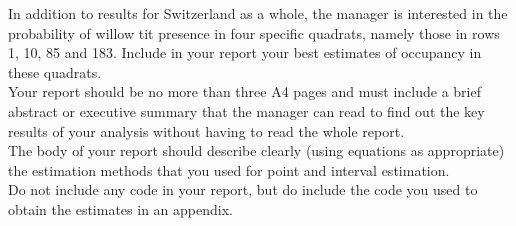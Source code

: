 In addition to results for Switzerland as a whole, the manager is interested in the probability of willow tit presence in four specific quadrats, namely those in rows 1, 10, 85 and 183. Include in your report your best estimates of occupancy in these quadrats. \\

Your report should be no more than three A4 pages and must include a brief abstract or executive summary that the manager can read to find out the key results of your analysis without having to read the whole report. \\

The body of your report should describe clearly (using equations as appropriate) the estimation methods that you used for point and interval estimation. \\

Do not include any code in your report, but do include the code you used to obtain the estimates in an appendix. 


